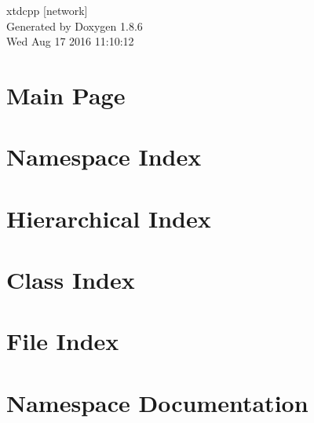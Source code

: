 \documentclass[twoside]{book}
\newcommand{\clearemptydoublepage}{%
  \newpage{\pagestyle{empty}\cleardoublepage}%
}
\begin{document}
\hypersetup{pageanchor=false}
\begin{titlepage}
\vspace*{7cm}
\begin{center}%
{\Large xtdcpp \mbox{[}network\mbox{]} }\\
\vspace*{1cm}
{\large Generated by Doxygen 1.8.6}\\
\vspace*{0.5cm}
{\small Wed Aug 17 2016 11:10:12}\\
\end{center}
\end{titlepage}
\clearemptydoublepage
\tableofcontents
\clearemptydoublepage
{}
\hypersetup{pageanchor=true}

\chapter{Main Page}
\label{index}\hypertarget{index}{}
\chapter{Namespace Index}

\chapter{Hierarchical Index}

\chapter{Class Index}

\chapter{File Index}

\chapter{Namespace Documentation}








\end{document}
